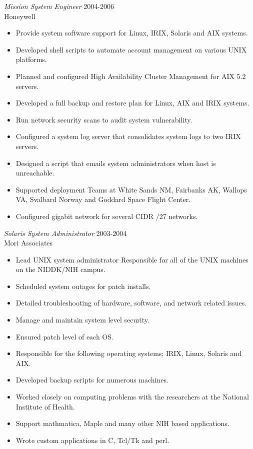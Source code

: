 \documentclass[margin, 10pt]{res} %
\begin{document}
\begin{resume}
{\sl Mission System Engineer } \hfill 2004-2006 \\
Honeywell
\begin{itemize}
\item Provide system software support for Linux, IRIX, Solaris and AIX systems.
\item Developed shell scripts to automate account management on various UNIX platforms.
\item Planned and configured High Availability Cluster Management for AIX 5.2 servers.
\item Developed a full backup and restore plan for Linux, AIX and IRIX systems.
\item Run network security scans to audit system vulnerability.
\item Configured a system log server that consolidates system logs to two IRIX servers.
\item Designed a script that emails system administrators when host is unreachable.
\item Supported deployment Teams at White Sands NM, Fairbanks AK, Wallops VA, Svalbard Norway and Goddard Space Flight Center.
\item Configured gigabit network for several CIDR /27 networks.
\end{itemize}

{\sl Solaris System Administrator} \hfill 2003-2004 \\
Mori Associates
\begin{itemize}
\item Lead UNIX system administrator Responsible for all of the UNIX machines on the NIDDK/NIH campus.
\item Scheduled system outages for patch installs.
\item Detailed troubleshooting of hardware, software, and network related issues.
\item Manage and maintain system level security.
\item Ensured patch level of each OS.
\item Responsible for the following operating systems; IRIX, Linux, Solaris and AIX.
\item Developed backup scripts for numerous machines.
\item Worked closely on computing problems with the researchers at the National Institute of Health.
\item Support mathmatica, Maple and many other NIH based applications.
\item Wrote custom applications in C, Tcl/Tk and perl.
\end{itemize}


\end{resume}
\end{document}
